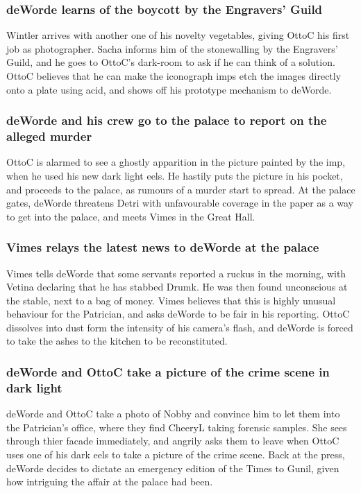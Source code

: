 \subsubsection{\Gls{deWorde} learns of the boycott by the Engravers' Guild}
\Gls{Wintler} arrives with another one of his novelty vegetables, giving \Gls{OttoC} his first job
as photographer. \Gls{Sacha} informs him of the stonewalling by the Engravers' Guild, and he goes
to \Gls{OttoC}'s dark-room to ask if he can think of a solution. \Gls{OttoC} believes that he can
make the iconograph imps etch the images directly onto a plate using acid, and shows off his
prototype mechanism to \Gls{deWorde}.

\subsubsection{\Gls{deWorde} and his crew go to the palace to report on the alleged murder}
\Gls{OttoC} is alarmed to see a ghostly apparition in the picture painted by the imp, when he used
his new dark light eels. He hastily puts the picture in his pocket, and proceeds to the palace,
as rumours of a murder start to spread. At the palace gates, \Gls{deWorde} threatens \Gls{Detri}
with unfavourable coverage in the paper as a way to get into the palace, and meets \Gls{Vimes} in
the Great Hall.

\subsubsection{\Gls{Vimes} relays the latest news to \Gls{deWorde} at the palace}
\Gls{Vimes} tells \Gls{deWorde} that some servants reported a ruckus in the morning, with
\Gls{Vetina} declaring that he has stabbed \Gls{Drumk}. He was then found unconscious at the stable,
next to a bag of money. \Gls{Vimes} believes that this is highly unusual behaviour for the
Patrician, and asks \Gls{deWorde} to be fair in his reporting. \Gls{OttoC} dissolves into dust form
the intensity of his camera's flash, and \Gls{deWorde} is forced to take the ashes to the kitchen
to be reconstituted.

\subsubsection{\Gls{deWorde} and \Gls{OttoC} take a picture of the crime scene in dark light}
\Gls{deWorde} and \Gls{OttoC} take a photo of \Gls{Nobby} and convince him to let them into the
Patrician's office, where they find \Gls{CheeryL} taking forensic samples. She sees through thier
facade immediately, and angrily asks them to leave when \Gls{OttoC} uses one of his dark eels to
take a picture of the crime scene. Back at the press, \Gls{deWorde} decides to dictate an emergency
edition of the Times to \Gls{Gunil}, given how intriguing the affair at the palace had been.

